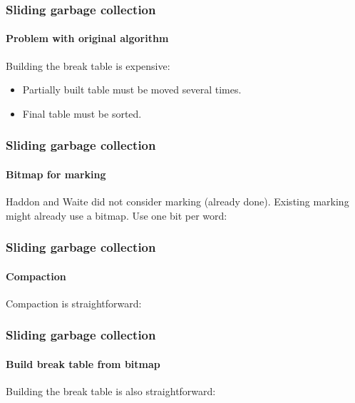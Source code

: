 \documentclass{beamer}
\def\inputfig#1{}
\begin{document}
\begin{frame}
  \frametitle{Sliding garbage collection} 
  \framesubtitle{Problem with original algorithm}

    Building the break table is expensive:

    \begin{itemize}
    \item Partially built table must be moved several times.
    \item Final table must be sorted.  
    \end{itemize}

\end{frame}
\begin{frame}
  \frametitle{Sliding garbage collection} 
  \framesubtitle{Bitmap for marking}

  Haddon and Waite did not consider marking (already done).  Existing
  marking might already use a bitmap.
  \vskip 1cm
  Use one bit per word:

  \begin{center}
\inputfig{fig-example-a.pdf_t}
  \end{center}
\end{frame}
\begin{frame}
  \frametitle{Sliding garbage collection} 
  \framesubtitle{Compaction}

  Compaction is straightforward:

  \begin{center}
\inputfig{fig-example-b.pdf_t}
  \end{center}

  \begin{center}
\inputfig{fig-example-c.pdf_t}
  \end{center}

\end{frame}
\begin{frame}
  \frametitle{Sliding garbage collection} 
  \framesubtitle{Build break table from bitmap}

  Building the break table is also straightforward:

  \begin{center}
\inputfig{fig-example-d.pdf_t}
  \end{center}

\end{frame}
\end{document}
